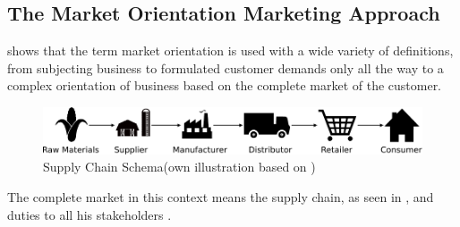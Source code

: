 \subsection{The Market Orientation Marketing Approach}
\textcite[9-10]{Claen.2016} shows that the term market orientation is used with a wide variety of definitions, from subjecting business to formulated customer demands only all the way to a complex orientation of business based on the complete market of the customer.
\begin{figure}[H]
	\includegraphics[width=\textwidth]{img/supplychain.pdf}
	\caption[Supply Chain Schema]{Supply Chain Schema(own illustration based on \protect\cite{SouthwestTech})}
    	\label{fig:supplychain}
\end{figure}
The complete market in this context means the supply chain, as seen in , and duties to all his stakeholders \parencite[cf.][22-23]{Claen.2016}.


